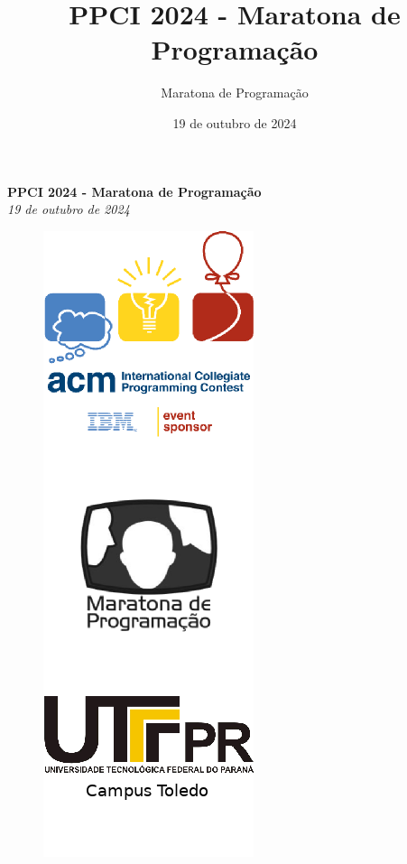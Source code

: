 \documentclass[12pt,oneside]{article} %
\title{PPCI 2024 - Maratona de Programação}
\author{Maratona de Programação}
\date{19 de outubro de 2024}
\begin{document}
\begin{center}
\textbf{\Huge PPCI 2024 - Maratona de Programação} \\
\vspace{0.2cm}
\textit{19 de outubro de 2024} \\
\vspace{1.0cm}
\begin{figure}[h!]
    \centering
    \includegraphics[scale=0.72]{capa.png}
\end{figure}


\end{center}
\end{document}
